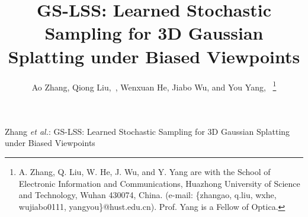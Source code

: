 \documentclass[lettersize,journal]{IEEEtran}
\begin{document}
\title{GS-LSS: Learned Stochastic Sampling for 3D Gaussian Splatting under Biased Viewpoints}

\author{Ao Zhang,
Qiong Liu,~, 
Wenxuan He, Jiabo Wu,
and You Yang,~
\thanks{A. Zhang, Q. Liu, W. He, J. Wu, and Y. Yang are with the School of Electronic Information and Communications, Huazhong University of Science and Technology, Wuhan 430074, China. (e-mail: \{zhangao, q.liu, wxhe, wujiabo0111, yangyou\}@hust.edu.cn). Prof. Yang is a Fellow of Optica.}
}

%
{Zhang \MakeLowercase{\textit{et al.}}: GS-LSS: Learned Stochastic Sampling for 3D Gaussian Splatting under Biased Viewpoints}


\maketitle
\end{document}
